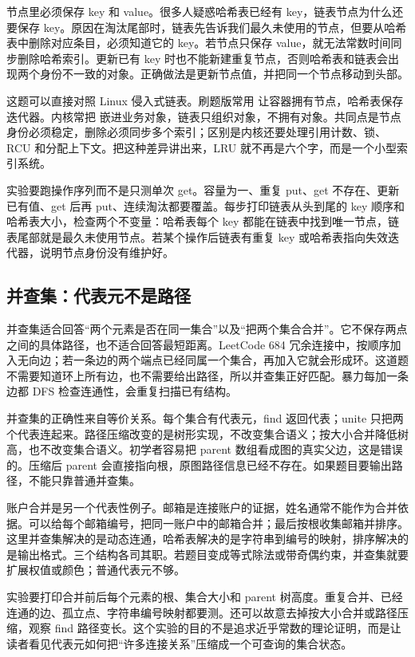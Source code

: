 节点里必须保存 key 和 value。很多人疑惑哈希表已经有 key，链表节点为什么还要保存 key。原因在淘汰尾部时，链表先告诉我们最久未使用的节点，但要从哈希表中删除对应条目，必须知道它的 key。若节点只保存 value，就无法常数时间同步删除哈希索引。更新已有 key 时也不能新建重复节点，否则哈希表和链表会出现两个身份不一致的对象。正确做法是更新节点值，并把同一个节点移动到头部。

这题可以直接对照 Linux 侵入式链表。刷题版常用  让容器拥有节点，哈希表保存迭代器。内核常把  嵌进业务对象，链表只组织对象，不拥有对象。共同点是节点身份必须稳定，删除必须同步多个索引；区别是内核还要处理引用计数、锁、RCU 和分配上下文。把这种差异讲出来，LRU 就不再是六个字，而是一个小型索引系统。

实验要跑操作序列而不是只测单次 get。容量为一、重复 put、get 不存在、更新已有值、get 后再 put、连续淘汰都要覆盖。每步打印链表从头到尾的 key 顺序和哈希表大小，检查两个不变量：哈希表每个 key 都能在链表中找到唯一节点，链表尾部就是最久未使用节点。若某个操作后链表有重复 key 或哈希表指向失效迭代器，说明节点身份没有维护好。

\subsection{并查集：代表元不是路径}

并查集适合回答“两个元素是否在同一集合”以及“把两个集合合并”。它不保存两点之间的具体路径，也不适合回答最短距离。LeetCode 684 冗余连接中，按顺序加入无向边；若一条边的两个端点已经同属一个集合，再加入它就会形成环。这道题不需要知道环上所有边，也不需要给出路径，所以并查集正好匹配。暴力每加一条边都 DFS 检查连通性，会重复扫描已有结构。

并查集的正确性来自等价关系。每个集合有代表元，find 返回代表；unite 只把两个代表连起来。路径压缩改变的是树形实现，不改变集合语义；按大小合并降低树高，也不改变集合语义。初学者容易把 parent 数组看成图的真实父边，这是错误的。压缩后 parent 会直接指向根，原图路径信息已经不存在。如果题目要输出路径，不能只靠普通并查集。

账户合并是另一个代表性例子。邮箱是连接账户的证据，姓名通常不能作为合并依据。可以给每个邮箱编号，把同一账户中的邮箱合并；最后按根收集邮箱并排序。这里并查集解决的是动态连通，哈希表解决的是字符串到编号的映射，排序解决的是输出格式。三个结构各司其职。若题目变成等式除法或带奇偶约束，并查集就要扩展权值或颜色；普通代表元不够。

实验要打印合并前后每个元素的根、集合大小和 parent 树高度。重复合并、已经连通的边、孤立点、字符串编号映射都要测。还可以故意去掉按大小合并或路径压缩，观察 find 路径变长。这个实验的目的不是追求近乎常数的理论证明，而是让读者看见代表元如何把“许多连接关系”压缩成一个可查询的集合状态。

